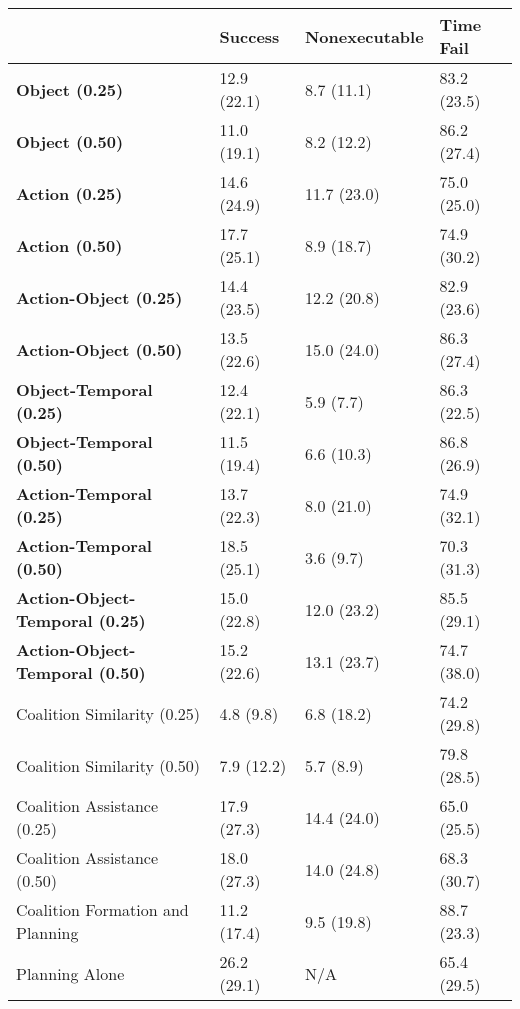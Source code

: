 \begin{tabular}{llll}
\hline
                                        & Success     & Nonexecutable   & Time Fail   \\
\hline
 \textbf{Object (0.25)}                 & 12.9 (22.1) & 8.7 (11.1)      & 83.2 (23.5) \\
 \textbf{Object (0.50)}                 & 11.0 (19.1) & 8.2 (12.2)      & 86.2 (27.4) \\
 \textbf{Action (0.25)}                 & 14.6 (24.9) & 11.7 (23.0)     & 75.0 (25.0) \\
 \textbf{Action (0.50)}                 & 17.7 (25.1) & 8.9 (18.7)      & 74.9 (30.2) \\
 \textbf{Action-Object (0.25)}          & 14.4 (23.5) & 12.2 (20.8)     & 82.9 (23.6) \\
 \textbf{Action-Object (0.50)}          & 13.5 (22.6) & 15.0 (24.0)     & 86.3 (27.4) \\
 \textbf{Object-Temporal (0.25)}        & 12.4 (22.1) & 5.9 (7.7)       & 86.3 (22.5) \\
 \textbf{Object-Temporal (0.50)}        & 11.5 (19.4) & 6.6 (10.3)      & 86.8 (26.9) \\
 \textbf{Action-Temporal (0.25)}        & 13.7 (22.3) & 8.0 (21.0)      & 74.9 (32.1) \\
 \textbf{Action-Temporal (0.50)}        & 18.5 (25.1) & 3.6 (9.7)       & 70.3 (31.3) \\
 \textbf{Action-Object-Temporal (0.25)} & 15.0 (22.8) & 12.0 (23.2)     & 85.5 (29.1) \\
 \textbf{Action-Object-Temporal (0.50)} & 15.2 (22.6) & 13.1 (23.7)     & 74.7 (38.0) \\
 Coalition Similarity (0.25)            & 4.8 (9.8)   & 6.8 (18.2)      & 74.2 (29.8) \\
 Coalition Similarity (0.50)            & 7.9 (12.2)  & 5.7 (8.9)       & 79.8 (28.5) \\
 Coalition Assistance (0.25)            & 17.9 (27.3) & 14.4 (24.0)     & 65.0 (25.5) \\
 Coalition Assistance (0.50)            & 18.0 (27.3) & 14.0 (24.8)     & 68.3 (30.7) \\
 Coalition Formation and Planning       & 11.2 (17.4) & 9.5 (19.8)      & 88.7 (23.3) \\
 Planning Alone                         & 26.2 (29.1) & N/A             & 65.4 (29.5) \\
\hline
\end{tabular}